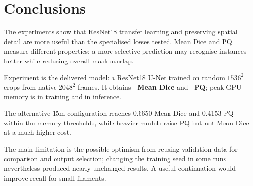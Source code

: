 \section{Conclusions}
\label{sec:conclusions}

The experiments show that ResNet18 transfer learning and preserving spatial detail are
more useful than the specialised losses tested. Mean Dice and PQ measure different
properties: a more selective prediction may recognise instances better while reducing
overall mask overlap.

Experiment \finalexperiment{} is the delivered model: a ResNet18 U-Net trained on random
$1536^2$ crops from native $2048^2$ frames. It obtains \textbf{\finaldice\ Mean Dice}
and \textbf{\finalpq\ PQ}; peak GPU memory is \finaltrainmemory{} in training and
\finaltestmemory{} in inference.

The alternative 15m configuration reaches 0.6650 Mean Dice and 0.4153 PQ within the
memory thresholds, while heavier models raise PQ but not Mean Dice at a much higher cost.

The main limitation is the possible optimism from reusing validation data for comparison
and output selection; changing the training seed in some runs nevertheless produced
nearly unchanged results. A useful continuation would improve recall for small filaments.
